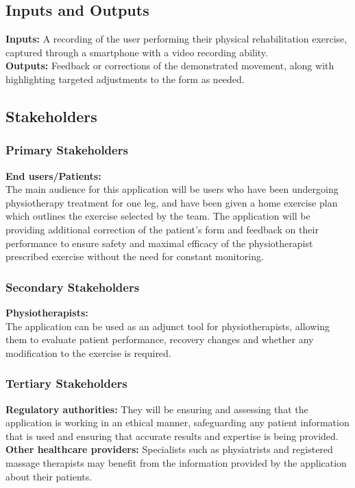 \documentclass{article}
\begin{document}
\subsection{Inputs and Outputs}

\textbf{Inputs:} A recording of the user performing their physical rehabilitation exercise, captured through a smartphone with a video recording ability. \\
\textbf{Outputs:} Feedback or corrections of the demonstrated movement, along with highlighting targeted adjustments to the form as needed. 

\subsection{Stakeholders}
  \subsubsection{Primary Stakeholders}
    \textbf{End users/Patients:} \\
    The main audience for this application will be users who have been undergoing physiotherapy treatment for one leg, and have been given a home exercise
    plan which outlines the exercise selected by the team. The application will be providing additional correction of the patient's form and feedback on their performance to ensure safety and maximal efficacy of the physiotherapist prescribed exercise without the need for constant monitoring. 
     
  \subsubsection{Secondary Stakeholders}
    \textbf{Physiotherapists:} \\
      The application can be used as an adjunct tool for physiotherapists, allowing them to evaluate patient performance, recovery changes and whether any modification to the exercise is required. \\
      
  \subsubsection{Tertiary Stakeholders}
    \textbf{Regulatory authorities:}
      They will be ensuring and assessing that the application is working in an ethical manner, safeguarding any patient information that is used and ensuring that accurate results and expertise is being provided. \\
    \textbf{Other healthcare providers:}
       Specialists such as physiatrists and registered massage therapists may benefit from the information provided by the application about their patients. 
\end{document}
